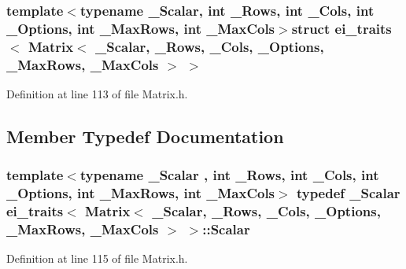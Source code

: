 \subsubsection*{template$<$typename \-\_\-\-Scalar, int \-\_\-\-Rows, int \-\_\-\-Cols, int \-\_\-\-Options, int \-\_\-\-Max\-Rows, int \-\_\-\-Max\-Cols$>$struct ei\-\_\-traits$<$ Matrix$<$ \-\_\-\-Scalar, \-\_\-\-Rows, \-\_\-\-Cols, \-\_\-\-Options, \-\_\-\-Max\-Rows, \-\_\-\-Max\-Cols $>$ $>$}



Definition at line 113 of file Matrix.\-h.



\subsection{Member Typedef Documentation}
\hypertarget{structei__traits_3_01_matrix_3_01___scalar_00_01___rows_00_01___cols_00_01___options_00_01___max42eca4acfde64c6129563dd143e7773e_a317465bc5205a1c9306b6c44b4b39649}{
\subsubsection[{Scalar}]{\setlength{\rightskip}{0pt plus 5cm}template$<$typename \-\_\-\-Scalar , int \-\_\-\-Rows, int \-\_\-\-Cols, int \-\_\-\-Options, int \-\_\-\-Max\-Rows, int \-\_\-\-Max\-Cols$>$ typedef \-\_\-\-Scalar {\bf ei\-\_\-traits}$<$ {\bf Matrix}$<$ \-\_\-\-Scalar, \-\_\-\-Rows, \-\_\-\-Cols, \-\_\-\-Options, \-\_\-\-Max\-Rows, \-\_\-\-Max\-Cols $>$ $>$\-::{\bf Scalar}}}\label{structei__traits_3_01_matrix_3_01___scalar_00_01___rows_00_01___cols_00_01___options_00_01___max42eca4acfde64c6129563dd143e7773e_a317465bc5205a1c9306b6c44b4b39649}


Definition at line 115 of file Matrix.\-h.




